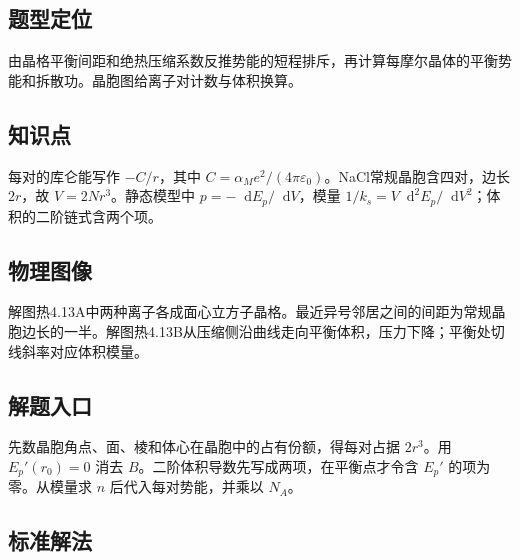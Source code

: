 \documentclass[UTF8,fontset=fandol,a4paper,11pt]{ctexart}
\newcommand{\dd}{\mathop{}\!\mathrm{d}}
\begin{document}


\subsection*{题型定位}

由晶格平衡间距和绝热压缩系数反推势能的短程排斥，再计算每摩尔晶体的平衡势能和拆散功。晶胞图给离子对计数与体积换算。



\subsection*{知识点}

每对的库仑能写作 $-C/r$，其中 $C=\alpha_Me^2/(4\pi\varepsilon_0)$。NaCl常规晶胞含四对，边长 $2r$，故 $V=2Nr^3$。静态模型中 $p=-\dd E_p/\dd V$，模量 $1/k_s=V\dd^2 E_p/\dd V^2$；体积的二阶链式含两个项。




\subsection*{物理图像}

解图热4.13A中两种离子各成面心立方子晶格。最近异号邻居之间的间距为常规晶胞边长的一半。解图热4.13B从压缩侧沿曲线走向平衡体积，压力下降；平衡处切线斜率对应体积模量。



\subsection*{解题入口}

先数晶胞角点、面、棱和体心在晶胞中的占有份额，得每对占据 $2r^3$。用 $E_p'(r_0)=0$ 消去 $B$。二阶体积导数先写成两项，在平衡点才令含 $E_p'$ 的项为零。从模量求 $n$ 后代入每对势能，并乘以 $N_A$。




\subsection*{标准解法}
\end{document}
